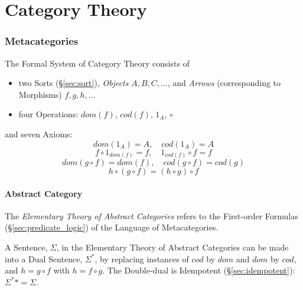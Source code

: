 \part{Category Theory}\label{sec:category_theory}\cite{awodey06}\cite{maclane69}

\section{Metacategories}\label{sec:metacategory}

The Formal System of Category Theory consists of
\begin{itemize}
\item two Sorts (\S\ref{sec:sort}), \emph{Objects} $A,B,C,\ldots$, and
  \emph{Arrows} (corresponding to Morphisms) $f,g,h,\ldots$
\item four Operations: $dom(f)$, $cod(f)$, $1_A$, $\circ$
\end{itemize}
and seven Axioms:
\[
    dom(1_A) = A,\quad cod(1_A) = A
\]\[
    f \circ 1_{dom(f)} = f, \quad 1_{cod(f)} \circ f = f
\]\[
    dom(g\circ f) = dom(f), \quad cod(g \circ f) = cod(g)
\]\[
    h \circ (g \circ f) = (h \circ g) \circ f
\]



\subsection{Abstract Category}\label{sec:abstract_category}

The \emph{Elementary Theory of Abstract Categories} refers to the
First-order Formulas (\S\ref{sec:predicate_logic}) of the Language
of Metacategories.

A Sentence, $\Sigma$, in the Elementary Theory of Abstract Categories
can be made into a Dual Sentence, $\Sigma^*$, by replacing instances
of $cod$ by $dom$ and $dom$ by $cod$, and $h = g \circ f$ with $h = f
\circ g$. The Double-dual is Idempotent (\S\ref{sec:idempotent}):
$\Sigma^** = \Sigma$.

